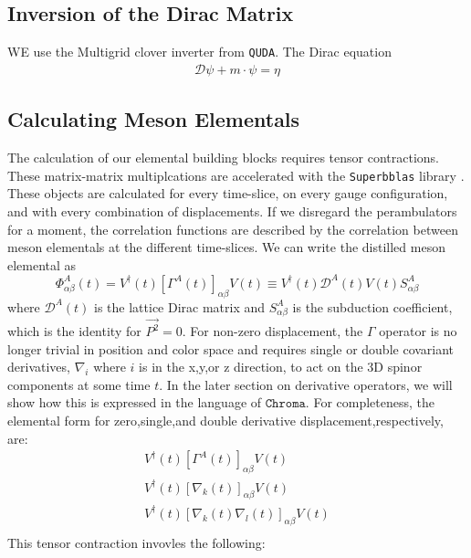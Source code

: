 \subsection{Inversion of the Dirac Matrix}
WE use the Multigrid clover inverter from \texttt{QUDA}. 
The Dirac equation 
\begin{align}
  \mathcal{D}\psi + m \cdot \psi = \eta
\end{align}


\subsection{Calculating Meson Elementals}
The calculation of our elemental building blocks requires tensor contractions. These matrix-matrix multiplcations are accelerated with the \texttt{Superbblas} library \cite{dinapoli2013efficientuseblaslibrary}. These objects are calculated for every time-slice, on every gauge configuration, and with every combination of displacements. If we disregard the perambulators for a moment, the correlation functions are described by the correlation between meson elementals at the different time-slices. We can write the distilled meson elemental as 
\begin{equation}
\Phi^A_{\alpha\beta}(t) = V^{\dagger}(t) [\Gamma^A(t)]_{\alpha\beta} V(t) \equiv V^{\dagger}(t)\mathcal{D}^A(t)V(t)S^A_{\alpha\beta}
\end{equation} where $\mathcal{D}^A(t)$ is the lattice Dirac matrix and $S^A_{\alpha\beta}$ is the subduction coefficient, which is the identity for $\vec{P^2} = 0$.
For non-zero displacement, the $\Gamma$ operator is no longer trivial in position and color space and requires single or double covariant derivatives, $\nabla_i$ where $i$ is in the x,y,or z direction, to act on the 3D spinor components at some time $t$. In the later section on derivative operators, we will show how this is expressed in the language of $\texttt{Chroma}$. For completeness, the elemental form for zero,single,and double derivative displacement,respectively, are: 
\begin{eqnarray}
  V^{\dagger}(t) [\Gamma^A(t)]_{\alpha\beta} V(t) \\ 
  V^{\dagger}(t) [\nabla_k(t)]_{\alpha\beta} V(t) \\ 
  V^{\dagger}(t) [\nabla_k(t)\nabla_l(t)]_{\alpha\beta} V(t) \\ 

\end{eqnarray}
This tensor contraction invovles the following\cite{romero_efficient_2020}: 
